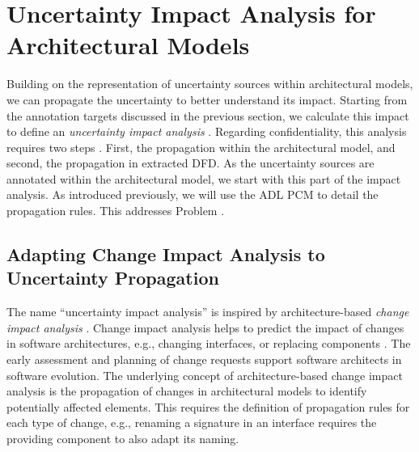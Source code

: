 \section{Uncertainty Impact Analysis for Architectural Models}%
\label{sec:impactanalysis:pcmpropagation}

Building on the representation of uncertainty sources within architectural models, we can propagate the uncertainty to better understand its impact.
Starting from the annotation targets discussed in the previous section, we calculate this impact to define an \emph{uncertainty impact analysis} \cite{hezavehi_uncertainty_2021}.
Regarding confidentiality, this analysis requires two steps \cite{hahner_architecture-based_2023}.
First, the propagation within the architectural model, and second, the propagation in extracted \ac{DFD}.
As the uncertainty sources are annotated within the architectural model, we start with this part of the impact analysis.
As introduced previously, we will use the \ac{ADL} \ac{PCM} to detail the propagation rules.
This addresses Problem .


\subsection{Adapting Change Impact Analysis to Uncertainty Propagation}

The name \enquote{uncertainty impact analysis} is inspired by architecture-based \emph{change impact analysis} \cite{heinrich_methodology_2018,rostami_architecture-based_2015,rostami_architecture-based_2017}.
Change impact analysis helps to predict the impact of changes in software architectures, e.g., changing interfaces, or replacing components \cite{rostami_architecture-based_2017}.
The early assessment and planning of change requests support software architects in software evolution.
The underlying concept of architecture-based change impact analysis is the propagation of changes in architectural models to identify potentially affected elements.
This requires the definition of propagation rules for each type of change, e.g., renaming a signature in an interface requires the providing component to also adapt its naming.


